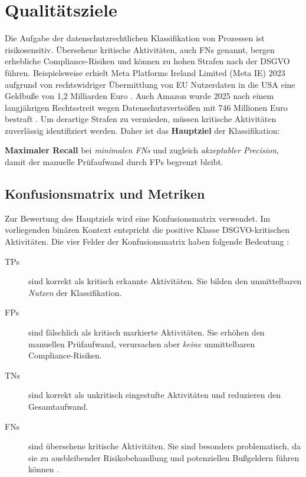 \section{Qualitätsziele}\label{sec:qualitatsziele}

Die Aufgabe der datenschutzrechtlichen Klassifikation von Prozessen ist risikosensitiv. Übersehene kritische Aktivitäten, auch \acp{FN} genannt, bergen erhebliche Compliance-Risiken und können zu hohen Strafen nach der \ac{DSGVO} führen. Beispielsweise erhielt Meta Platforms Ireland Limited (Meta IE) 2023 aufgrund von rechtswidriger Übermittlung von \ac{EU} Nutzerdaten in die USA eine Geldbuße von 1,2 Milliarden Euro \cite{edpb-meta-fine}. Auch Amazon wurde 2025 nach einem langjährigen Rechtsstreit wegen Datenschutzvertsößen mit 746 Millionen Euro bestraft \cite{datenschutzticker-amazon-fine, reuters-amazon-fine}. Um derartige Strafen zu vermieden, müssen kritische Aktivitäten zuverlässig identifiziert werden. Daher ist das \textbf{Hauptziel} der Klassifikation:

\begin{hauptzielbox}
    \textbf{Maximaler Recall} bei \emph{minimalen \acp{FN}} und zugleich \emph{akzeptabler Precision}, damit der manuelle Prüfaufwand durch \acp{FP} begrenzt bleibt.
\end{hauptzielbox}

\subsection*{Konfusionsmatrix und Metriken}

Zur Bewertung des Hauptziels wird eine Konfusionsmatrix verwendet. Im vorliegenden binären Kontext entspricht die positive Klasse \ac{DSGVO}-kritischen Aktivitäten. Die vier Felder der Konfusionsmatrix haben folgende Bedeutung \cite{sokolova2009measureclassification}:

\begin{description}
    \item [\acp{TP}] sind korrekt als kritisch erkannte Aktivitäten. Sie bilden den unmittelbaren \emph{Nutzen} der Klassifikation.
    \item [\acp{FP}] sind fälschlich als kritisch markierte Aktivitäten. Sie erhöhen den manuellen Prüfaufwand, verursachen aber \emph{keine} unmittelbaren Compliance-Risiken.
    \item[\acp{TN}] sind korrekt als unkritisch eingestufte Aktivitäten und reduzieren den Gesamtaufwand.
    \item[\acp{FN}] sind übersehene kritische Aktivitäten. Sie sind besonders problematisch, da sie zu ausbleibender Risikobehandlung und potenziellen Bußgeldern führen können \cite{nake2023towards}.
\end{description}

